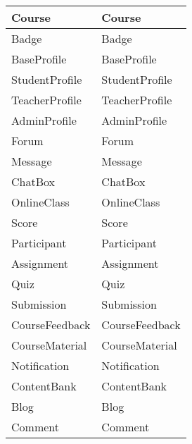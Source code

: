 \documentclass[./../main_file.tex]{subfiles}
\begin{document}
\begin{longtable}{|p{.5\linewidth}|p{.5\linewidth}|}
		Course                     & Course                   \\ \hline
		Badge                      & Badge                    \\ \hline
		BaseProfile                & BaseProfile              \\ \hline
		StudentProfile             & StudentProfile           \\ \hline
		TeacherProfile             & TeacherProfile           \\ \hline
		AdminProfile               & AdminProfile             \\ \hline
		Forum                      & Forum                    \\ \hline
		Message                    & Message                  \\ \hline
		ChatBox                    & ChatBox                  \\ \hline
		OnlineClass                & OnlineClass              \\ \hline
		Score                      & Score                    \\ \hline
		Participant                & Participant              \\ \hline
		Assignment                 & Assignment               \\ \hline
		Quiz                       & Quiz                     \\ \hline
		Submission                 & Submission               \\ \hline
		CourseFeedback             & CourseFeedback           \\ \hline
		CourseMaterial             & CourseMaterial           \\ \hline
		Notification               & Notification             \\ \hline
		ContentBank                & ContentBank              \\ \hline
		Blog                       & Blog                     \\ \hline
		Comment                    & Comment                  \\ \hline
	\end{longtable}
\end{document}
